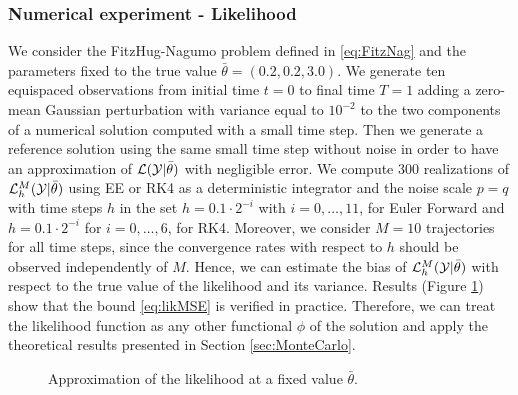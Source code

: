 \subsubsection{Numerical experiment - Likelihood}

We consider the FitzHug-Nagumo problem defined in \eqref{eq:FitzNag} and the parameters fixed to the true value $\bar\theta = (0.2, 0.2, 3.0)$. We generate ten equispaced observations from initial time $t = 0$ to final time $T = 1$ adding a zero-mean Gaussian perturbation with variance equal to $10^{-2}$ to the two components of a numerical solution computed with a small time step. Then we generate a reference solution using the same small time step without noise in order to have an approximation of $\mathcal{L}(\mathcal{Y}|\bar \theta)$ with negligible error. We compute 300 realizations of $\mathcal{L}_h^M(\mathcal{Y}|\bar \theta)$ using EE or RK4 as a deterministic integrator and the noise scale $p = q$ with time steps $h$ in the set $h = 0.1\cdot 2^{-i}$ with $i = 0, \ldots, 11$, for Euler Forward and $h = 0.1\cdot2^{-i}$ for $i = 0, \ldots, 6$, for RK4. Moreover, we consider $M = 10$ trajectories for all time steps, since the convergence rates with respect to $h$ should be observed independently of $M$. Hence, we can estimate the bias of $\mathcal{L}_h^M(\mathcal{Y}|\bar \theta)$ with respect to the true value of the likelihood and its variance. Results (Figure \ref{fig:LikelihoodApprox}) show that the bound \eqref{eq:likMSE} is verified in practice. Therefore, we can treat the likelihood function as any other functional $\phi$ of the solution and apply the theoretical results presented in Section \ref{sec:MonteCarlo}. 

\begin{figure}
	\centering
	\resizebox{0.6\linewidth}{!}{}
	\caption{Approximation of the likelihood at a fixed value $\bar \theta$.}
	\label{fig:LikelihoodApprox}
\end{figure}